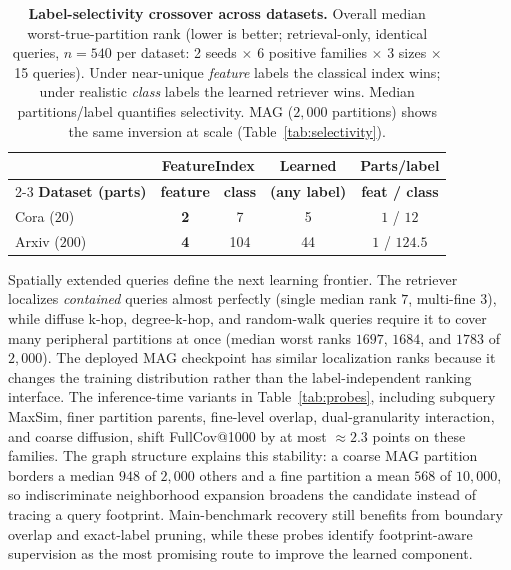 \documentclass[runningheads]{llncs}
\begin{document}
\begin{table}[H]
\centering
\caption{\textbf{Label-selectivity crossover across datasets.} Overall median worst-true-partition rank (lower is better; retrieval-only, identical queries, $n{=}540$ per dataset: 2 seeds $\times$ 6 positive families $\times$ 3 sizes $\times$ 15 queries). Under near-unique \emph{feature} labels the classical index wins; under realistic \emph{class} labels the learned retriever wins. Median partitions/label quantifies selectivity. MAG ($2{,}000$ partitions) shows the same inversion at scale (Table~\ref{tab:selectivity}).}
\label{tab:selectivity_xd}
\small
\setlength{\tabcolsep}{6pt}
\begin{tabular}{lcccc}
\toprule
 & \multicolumn{2}{c}{\textbf{FeatureIndex}} & \textbf{Learned} & \textbf{Parts/label} \\
\cmidrule(lr){2-3}
\textbf{Dataset (parts)} & \textbf{feature} & \textbf{class} & \textbf{(any label)} & \textbf{feat / class} \\
\midrule
Cora ($20$)    & \textbf{2} & 7   & 5  & $1$ / $12$ \\
Arxiv ($200$)  & \textbf{4} & 104 & 44 & $1$ / $124.5$ \\
\bottomrule
\end{tabular}
\end{table}

Spatially extended queries define the next learning frontier. The retriever localizes \emph{contained} queries almost perfectly (single median rank $7$, multi-fine $3$), while diffuse k-hop, degree-k-hop, and random-walk queries require it to cover many peripheral partitions at once (median worst ranks $1697$, $1684$, and $1783$ of $2{,}000$). The deployed MAG checkpoint has similar localization ranks because it changes the training distribution rather than the label-independent ranking interface. The inference-time variants in Table~\ref{tab:probes}, including subquery MaxSim, finer partition parents, fine-level overlap, dual-granularity interaction, and coarse diffusion, shift FullCov@1000 by at most ${\approx}2.3$ points on these families. The graph structure explains this stability: a coarse MAG partition borders a median $948$ of $2{,}000$ others and a fine partition a mean $568$ of $10{,}000$, so indiscriminate neighborhood expansion broadens the candidate instead of tracing a query footprint. Main-benchmark recovery still benefits from boundary overlap and exact-label pruning, while these probes identify footprint-aware supervision as the most promising route to improve the learned component.
\end{document}
